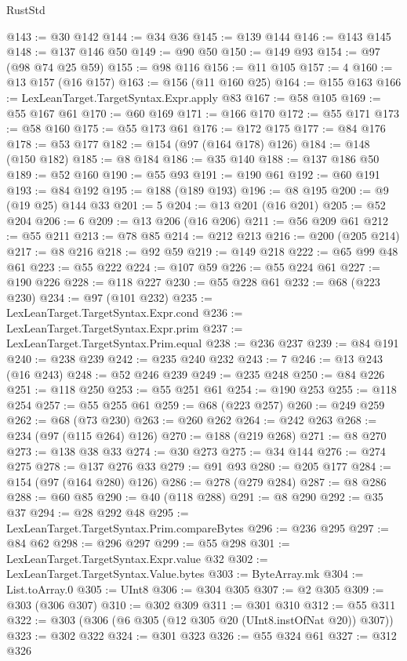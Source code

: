 \begin{lexlean}{RustStd}
\begin{coremodule}
{\begin{coremodule}
{{{{{{{{{{{{@143 := @30 @142
@144 := @34 @36
@145 := @139 @144
@146 := @143 @145
@148 := @137 @146 @50
@149 := @90 @50
@150 := @149 @93
@154 := @97 (@98 @74 @25 @59)
@155 := @98 @116
@156 := @11 @105
@157 := 4
@160 := @13 @157 (@16 @157)
@163 := @156 (@11 @160 @25)
@164 := @155 @163
@166 := LexLeanTarget.TargetSyntax.Expr.apply @83
@167 := @58 @105
@169 := @55 @167 @61
@170 := @60 @169
@171 := @166 @170
@172 := @55 @171
@173 := @58 @160
@175 := @55 @173 @61
@176 := @172 @175
@177 := @84 @176
@178 := @53 @177
@182 := @154 (@97 (@164 @178) @126)
@184 := @148 (@150 @182)
@185 := @8 @184
@186 := @35 @140
@188 := @137 @186 @50
@189 := @52 @160
@190 := @55 @93
@191 := @190 @61
@192 := @60 @191
@193 := @84 @192
@195 := @188 (@189 @193)
@196 := @8 @195
@200 := @9 (@19 @25) @144 @33
@201 := 5
@204 := @13 @201 (@16 @201)
@205 := @52 @204
@206 := 6
@209 := @13 @206 (@16 @206)
@211 := @56 @209 @61
@212 := @55 @211
@213 := @78 @85
@214 := @212 @213
@216 := @200 (@205 @214)
@217 := @8 @216
@218 := @92 @59
@219 := @149 @218
@222 := @65 @99 @48 @61
@223 := @55 @222
@224 := @107 @59
@226 := @55 @224 @61
@227 := @190 @226
@228 := @118 @227
@230 := @55 @228 @61
@232 := @68 (@223 @230)
@234 := @97 (@101 @232)
@235 := LexLeanTarget.TargetSyntax.Expr.cond
@236 := LexLeanTarget.TargetSyntax.Expr.prim
@237 := LexLeanTarget.TargetSyntax.Prim.equal
@238 := @236 @237
@239 := @84 @191
@240 := @238 @239
@242 := @235 @240 @232
@243 := 7
@246 := @13 @243 (@16 @243)
@248 := @52 @246 @239
@249 := @235 @248
@250 := @84 @226
@251 := @118 @250
@253 := @55 @251 @61
@254 := @190 @253
@255 := @118 @254
@257 := @55 @255 @61
@259 := @68 (@223 @257)
@260 := @249 @259
@262 := @68 (@73 @230)
@263 := @260 @262
@264 := @242 @263
@268 := @234 (@97 (@115 @264) @126)
@270 := @188 (@219 @268)
@271 := @8 @270
@273 := @138 @38 @33
@274 := @30 @273
@275 := @34 @144
@276 := @274 @275
@278 := @137 @276 @33
@279 := @91 @93
@280 := @205 @177
@284 := @154 (@97 (@164 @280) @126)
@286 := @278 (@279 @284)
@287 := @8 @286
@288 := @60 @85
@290 := @40 (@118 @288)
@291 := @8 @290
@292 := @35 @37
@294 := @28 @292 @48
@295 := LexLeanTarget.TargetSyntax.Prim.compareBytes
@296 := @236 @295
@297 := @84 @62
@298 := @296 @297
@299 := @55 @298
@301 := LexLeanTarget.TargetSyntax.Expr.value @32
@302 := LexLeanTarget.TargetSyntax.Value.bytes
@303 := ByteArray.mk
@304 := List.toArray.{0}
@305 := UInt8
@306 := @304 @305
@307 := @2 @305
@309 := @303 (@306 @307)
@310 := @302 @309
@311 := @301 @310
@312 := @55 @311
@322 := @303 (@306 (@6 @305 (@12 @305 @20 (UInt8.instOfNat @20)) @307))
@323 := @302 @322
@324 := @301 @323
@326 := @55 @324 @61
@327 := @312 @326
}}}}}}}}}}}}
\end{coremodule}}
\end{coremodule}
\end{lexlean}
